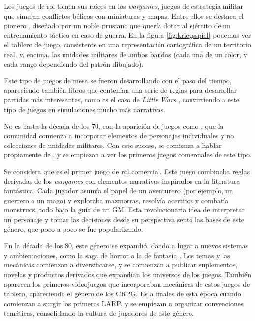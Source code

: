\medskip


Los juegos de rol tienen sus raíces en los \textit{wargames}, juegos de estrategia militar que simulan conflictos bélicos con miniaturas y mapas. Entre ellos se destaca el pionero \cite{kriegsspiel}, diseñado por un noble prusiano que quería dotar al ejército de un entrenamiento táctico en caso de guerra. En la figura \ref{fig:kriegsspiel} podemos ver el tablero de juego, consistente en una representación cartográfica de un territorio real, y, encima, las unidades militares de ambos bandos (cada una de un color, y cada rango dependiendo del patrón dibujado).

\smallskip

Este tipo de juegos de mesa se fueron desarrollando con el paso del tiempo, apareciendo también libros que contenían una serie de reglas para desarrollar partidas más interesantes, como es el caso de \textit{Little Wars} \citep{littlewars}, convirtiendo a este tipo de juegos en simulaciones mucho más narrativas.

\medskip

No es hasta la década de los 70, con la aparición de juegos como \cite{chainmail}, que la comunidad comienza a incorporar elementos de personajes individuales y no colecciones de unidades militares. Con este suceso, se comienza a hablar propiamente de , y se empiezan a ver los primeros juegos comerciales de este tipo.

\medskip

Se considera que \cite{ogdnd} es el primer juego de rol comercial. Este juego combinaba reglas derivadas de los \textit{wargames} con elementos narrativos inspirados en la literatura fantástica. Cada jugador asumía el papel de un aventurero (por ejemplo, un guerrero o un mago) y exploraba mazmorras, resolvía acertijos y combatía monstruos, todo bajo la guía de un GM. Esta revolucionaria idea de interpretar un personaje y tomar las decisiones desde su perspectiva sentó las bases de este género, que poco a poco se fue popularizando.

\medskip

En la década de los 80, este género se expandió, dando a lugar a nuevos sistemas y ambientaciones, como la saga de horror \cite{cthulhu} o la de fantasía \cite{rq}. Los temas y las mecánicas comienzan a diversificarse, y se comienzan a publicar suplementos, novelas y productos derivados que expandían los universos de los juegos. También aparecen los primeros videojuegos que incorporaban mecánicas de estos juegos de tablero, apareciendo el género de los CRPG. Es a finales de esta época cuando comienzan a surgir los primeros LARP, y se empiezan a organizar convenciones temáticas, consolidando la cultura de jugadores de este género.

